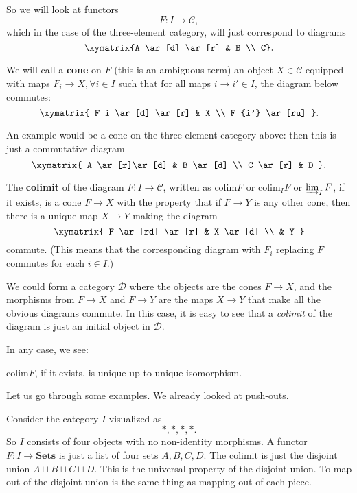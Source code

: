 So we will look at functors
\[ F: I \to \mathcal{C},  \]
which in the case of the three-element category, will just
 correspond to
diagrams
\[ \xymatrix{A \ar[d]  \ar[r] &  B \\ C}.  \]

We will call a \textbf{cone} on $F$ (this is an ambiguous term) an object $X
\in \mathcal{C}$ equipped with maps $F_i \to X, \forall i \in I$ such that for
all maps $i \to
i' \in I$, the diagram below commutes:
\[ \xymatrix{
F_i \ar[d] \ar[r] &  X \\
F_{i'} \ar[ru]
}.\]

An example would be a cone on the three-element category above: then
this is just a commutative diagram
\[ \xymatrix{
A \ar[r]\ar[d]  &  B \ar[d]  \\
C \ar[r] &  D
}.\]

\newcommand{\colim}{\mathrm{colim}}

\begin{definition}
The \textbf{colimit} of the diagram $F: I \to \mathcal{C}$, written as $\colim
F$ or $\colim_I F $ or $\varinjlim_I F$, if it exists, is a cone $F \to X$ with
the property that if $F \to Y$ is any other cone, then there is a unique map $X
\to Y$ making the diagram
\[ \xymatrix{
F  \ar[rd] \ar[r] &  X \ar[d]  \\
& Y
}\]
commute. (This means that the corresponding diagram with $F_i$ replacing $F$
commutes for each $i \in I$.)
\end{definition}

We could form a category $\mathcal{D}$ where the objects are the cones $F \to
X$, and the morphisms from $F \to X$ and $F \to Y$ are the maps $X \to Y$ that
make all the obvious diagrams commute. In this case, it is easy to see that a
\emph{colimit} of the diagram is just an initial object in $\mathcal{D}$.

 In any case, we see:

\begin{proposition}
$\colim F$, if it exists, is unique up to unique isomorphism.
\end{proposition}

Let us go through some examples. We already looked at push-outs.

\begin{example}
Consider the category $I$ visualized as
\[ \ast, \ast, \ast, \ast.  \]
So $I$ consists of four objects with no non-identity morphisms.
A functor $F: I \to \mathbf{Sets}$ is just a list of four sets $A, B, C, D$.
The colimit is just the disjoint union $A \sqcup B \sqcup C \sqcup D$. This is
the universal property of the disjoint union. To map out of the disjoint union
is the same thing as mapping out of each piece.
\end{example}


